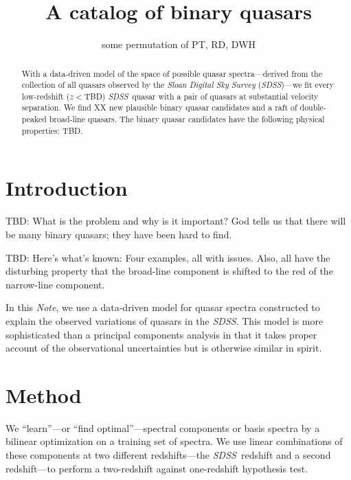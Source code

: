 \documentclass[preprint]{aastex}
\newcounter{address}
\newcommand{\project}[1]{\textsl{#1}}
\newcommand{\SDSS}{\project{SDSS}}
\newcommand{\documentname}{\textsl{Note}}
\begin{document}
\title{A catalog of binary quasars}
\author{some permutation of PT\altaffilmark{\ref{MPIA}},
        RD\altaffilmark{\ref{MPIA}},
        DWH\altaffilmark{\ref{MPIA},\ref{CCPP}}}
\setcounter{address}{1}

\begin{abstract}
  With a data-driven model of the space of possible quasar
  spectra---derived from the collection of all quasars observed by the
  \project{Sloan Digital Sky Survey} (\SDSS)---we fit every
  low-redshift ($z<$TBD) \SDSS\ quasar with a pair of quasars at
  substantial velocity separation.  We find XX new plausible binary
  quasar candidates and a raft of double-peaked broad-line quasars.
  The binary quasar candidates have the following physical properties:
  TBD.
\end{abstract}

\section{Introduction}

TBD: What is the problem and why is it important?  God tells us that
there will be many binary quasars; they have been hard to find.

TBD: Here's what's known: Four examples, all with issues.  Also, all
have the disturbing property that the broad-line component is shifted
to the red of the narrow-line component.

In this \documentname, we use a data-driven model for quasar spectra
constructed to explain the observed variations of quasars in the
\SDSS.  This model is more sophisticated than a principal components
analysis in that it takes proper account of the observational
uncertainties but is otherwise similar in spirit.

\section{Method}

We ``learn''---or ``find optimal''---spectral components or basis
spectra by a bilinear optimization on a training set of spectra.  We
use linear combinations of these components at two different
redshifts---the \SDSS\ redshift and a second redshift---to perform a
two-redshift against one-redshift hypothesis test.
\end{document}
